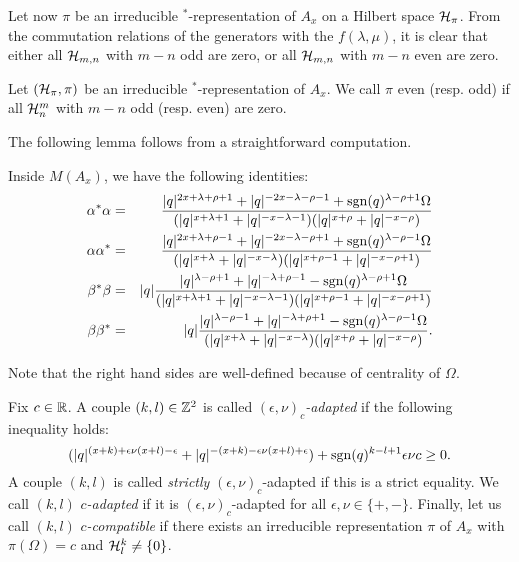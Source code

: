 Let now $\pi$ be an irreducible $^*$-representation of $A_x$ on a Hilbert space $\mathcal{H}_{\pi}$. From the commutation relations of the generators with the $f(\lambda,\mu)$, it is clear that either all $\mathcal{H}_{m,n}$ with $m-n$ odd are zero, or all $\mathcal{H}_{m,n}$ with $m-n$ even are zero. 

\begin{Def} Let $(\mathcal{H}_{\pi},\pi)$ be an irreducible $^*$-representation of $A_x$. We call $\pi$ even (resp. odd) if all $\mathcal{H}^m_n$ with $m-n$ odd (resp. even) are zero.
\end{Def} 


The following lemma follows from a straightforward computation.

\begin{Lem} Inside $M(A_x)$, we have the following identities:
\begin{eqnarray*}
\alpha^*\alpha &=& \frac{|q|^{2x+\lambda+\rho+1}+|q|^{-2x-\lambda-\rho-1}+\operatorname{\mathrm{sgn}}(q)^{\lambda-\rho+1}\Omega}{(|q|^{x+\lambda+1}+|q|^{-x-\lambda-1})(|q|^{x+\rho}+|q|^{-x-\rho})}\\
\alpha\alpha^* &=& \frac{|q|^{2x+\lambda+\rho-1}+|q|^{-2x-\lambda-\rho+1}+\operatorname{\mathrm{sgn}}(q)^{\lambda-\rho-1}\Omega}{(|q|^{x+\lambda}+|q|^{-x-\lambda})(|q|^{x+\rho-1}+|q|^{-x-\rho+1})}\\
\beta^*\beta &=& |q|\frac{|q|^{\lambda-\rho+1}+|q|^{-\lambda+\rho-1}-\operatorname{\mathrm{sgn}}(q)^{\lambda-\rho+1}\Omega}{(|q|^{x+\lambda+1}+|q|^{-x-\lambda-1})(|q|^{x+\rho-1}+|q|^{-x-\rho+1})}\\
\beta\beta^* &=&  |q|\frac{|q|^{\lambda-\rho-1}+|q|^{-\lambda+\rho+1}-\operatorname{\mathrm{sgn}}(q)^{\lambda-\rho-1}\Omega}{(|q|^{x+\lambda}+|q|^{-x-\lambda})(|q|^{x+\rho}+|q|^{-x-\rho})}.
\end{eqnarray*}
\end{Lem}

Note that the right hand sides are well-defined because of centrality of $\Omega$.

\begin{Def} Fix $c\in \mathbb{R}$. A couple $(k,l)\in \mathbb{Z}^2$ is called \emph{$(\epsilon,\nu)_c$-adapted} if the following inequality holds: \begin{equation}\label{EqAd}(|q|^{(x+k)+\epsilon\nu(x+l)-\epsilon}+|q|^{-(x+k)-\epsilon\nu(x+l)+\epsilon})+\operatorname{\mathrm{sgn}}(q)^{k-l+1}\epsilon\nu c\geq 0.\end{equation} A couple $(k,l)$ is called \emph{strictly} $(\epsilon,\nu)_c$-adapted if this is a strict equality. We call $(k,l)$ \emph{$c$-adapted} if it is $(\epsilon,\nu)_c$-adapted for all $\epsilon,\nu\in \{+,-\}$. Finally, let us call $(k,l)$ \emph{$c$-compatible} if there exists an irreducible representation $\pi$ of $A_x$ with $\pi(\Omega) = c$ and $\mathcal{H}^{k}_{l}\neq \{0\}$.
\end{Def} 

